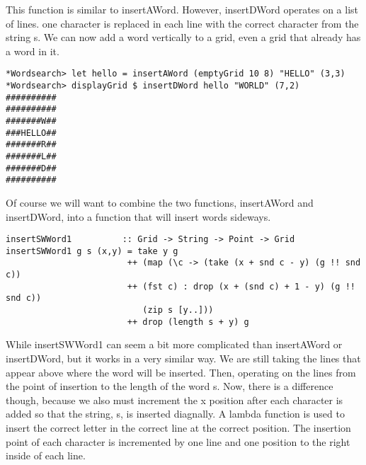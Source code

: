 \documentclass[12pt]{report}   %
\begin{document}
    \vspace{12pt}

    This function is similar to insertAWord. However, insertDWord operates on a
    list of lines. one character is replaced in each line with the correct 
    character from the string s. We can now add a word vertically to a grid, 
    even a grid that already has a word in it.

    \vspace{12pt}

    \begin{lstlisting}
*Wordsearch> let hello = insertAWord (emptyGrid 10 8) "HELLO" (3,3)
*Wordsearch> displayGrid $ insertDWord hello "WORLD" (7,2)
##########
##########
#######W##
###HELLO##
#######R##
#######L##
#######D##
##########
    \end{lstlisting}

    \vspace{12pt}

    Of course we will want to combine the two functions, insertAWord and 
    insertDWord, into a function that will insert words sideways.

    \vspace{12pt}

    \begin{lstlisting}
insertSWWord1          :: Grid -> String -> Point -> Grid
insertSWWord1 g s (x,y) = take y g 
                        ++ (map (\c -> (take (x + snd c - y) (g !! snd c)) 
                        ++ (fst c) : drop (x + (snd c) + 1 - y) (g !! snd c)) 
                           (zip s [y..])) 
                        ++ drop (length s + y) g
    \end{lstlisting}

    \vspace{12pt}

    While insertSWWord1 can seem a bit more complicated than insertAWord or 
    insertDWord, but it works in a very similar way. We are still taking the
    lines that appear above where the word will be inserted. Then, operating
    on the lines from the point of insertion to the length of the word s. Now,
    there is a difference though, because we also must increment the x
    position after each character is added so that the string, s, is inserted
    diagnally. A lambda function is used to insert the correct letter in the 
    correct line at the correct position. The insertion point of each character 
    is incremented by one line and one position to the right inside of each 
    line.
\end{document}
